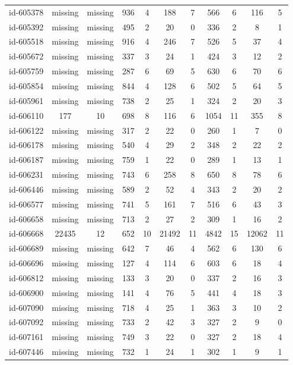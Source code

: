 \begin{tabular}{ccccccccccc}
id-605378 & missing & missing & 936 & 4 & 188 & 7 & 566 & 6 & 116 & 5\\
id-605392 & missing & missing & 495 & 2 & 20 & 0 & 336 & 2 & 8 & 1\\
id-605518 & missing & missing & 916 & 4 & 246 & 7 & 526 & 5 & 37 & 4\\
id-605672 & missing & missing & 337 & 3 & 24 & 1 & 424 & 3 & 12 & 2\\
id-605759 & missing & missing & 287 & 6 & 69 & 5 & 630 & 6 & 70 & 6\\
id-605854 & missing & missing & 844 & 4 & 128 & 6 & 502 & 5 & 64 & 5\\
id-605961 & missing & missing & 738 & 2 & 25 & 1 & 324 & 2 & 20 & 3\\
id-606110 & 177 & 10 & 698 & 8 & 116 & 6 & 1054 & 11 & 355 & 8\\
id-606122 & missing & missing & 317 & 2 & 22 & 0 & 260 & 1 & 7 & 0\\
id-606178 & missing & missing & 540 & 4 & 29 & 2 & 348 & 2 & 22 & 2\\
id-606187 & missing & missing & 759 & 1 & 22 & 0 & 289 & 1 & 13 & 1\\
id-606231 & missing & missing & 743 & 6 & 258 & 8 & 650 & 8 & 78 & 6\\
id-606446 & missing & missing & 589 & 2 & 52 & 4 & 343 & 2 & 20 & 2\\
id-606577 & missing & missing & 741 & 5 & 161 & 7 & 516 & 6 & 43 & 3\\
id-606658 & missing & missing & 713 & 2 & 27 & 2 & 309 & 1 & 16 & 2\\
id-606668 & 22435 & 12 & 652 & 10 & 21492 & 11 & 4842 & 15 & 12062 & 11\\
id-606689 & missing & missing & 642 & 7 & 46 & 4 & 562 & 6 & 130 & 6\\
id-606696 & missing & missing & 127 & 4 & 114 & 6 & 603 & 6 & 18 & 4\\
id-606812 & missing & missing & 133 & 3 & 20 & 0 & 337 & 2 & 16 & 3\\
id-606900 & missing & missing & 141 & 4 & 76 & 5 & 441 & 4 & 18 & 3\\
id-607090 & missing & missing & 718 & 4 & 25 & 1 & 363 & 3 & 10 & 2\\
id-607092 & missing & missing & 733 & 2 & 42 & 3 & 327 & 2 & 9 & 0\\
id-607161 & missing & missing & 749 & 3 & 22 & 0 & 327 & 2 & 18 & 4\\
id-607446 & missing & missing & 732 & 1 & 24 & 1 & 302 & 1 & 9 & 1\\

\end{tabular}
